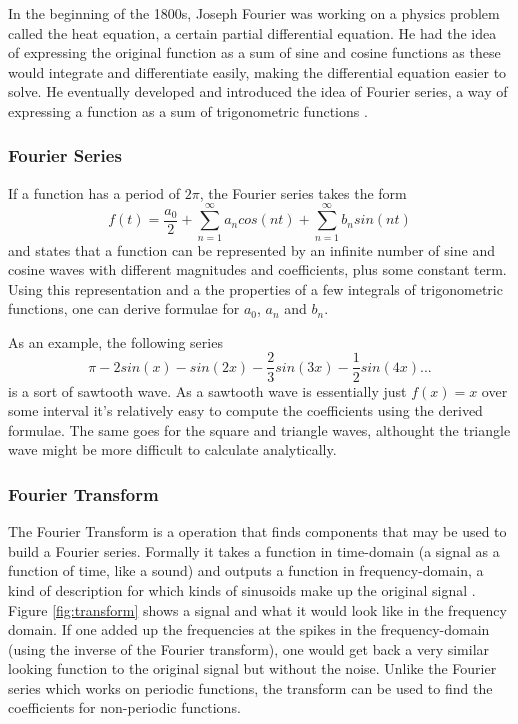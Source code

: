 In the beginning of the 1800s, Joseph Fourier was working on a physics problem called the heat equation, a certain partial differential equation. He had the idea of expressing the original function as a sum of sine and cosine functions as these would integrate and differentiate easily, making the differential equation easier to solve. He eventually developed and introduced the idea of Fourier series, a way of expressing a function as a sum of trigonometric functions \cite{Bounchaleun2019}.
\subsubsection{Fourier Series} 
If a function has a period of $2\pi$, the Fourier series takes the form $$f(t) = \frac{a_0}{2} + \sum_{n=1}^{\infty}a_ncos(nt)+\sum_{n=1}^{\infty}b_nsin(nt)$$ and states that a function can be represented by an infinite number of sine and cosine waves with different magnitudes and coefficients, plus some constant term. Using this representation and a the properties of a few integrals of trigonometric functions, one can derive formulae for $a_0$, $a_n$ and $b_n$.

As an example, the following series $$\pi -2sin(x) -sin(2x) -\frac{2}{3}sin(3x) -\frac{1}{2}sin(4x) ... $$ is a sort of sawtooth wave. As a sawtooth wave is essentially just $f(x) = x$ over some interval it's relatively easy to compute the coefficients using the derived formulae. The same goes for the square and triangle waves, althought the triangle wave might be more difficult to calculate analytically.
 
\subsubsection{Fourier Transform} 
The Fourier Transform is a operation that finds components that may be used to build a Fourier series. Formally it takes a function in time-domain (a signal as a function of time, like a sound) and outputs a function in frequency-domain, a kind of description for which kinds of sinusoids make up the original signal \cite{SimonXu2015}. Figure \ref{fig:transform} shows a signal and what it would look like in the frequency domain. If one added up the frequencies at the spikes in the frequency-domain (using the inverse of the Fourier transform), one would get back a very similar looking function to the original signal but without the noise. Unlike the Fourier series which works on periodic functions, the transform can be used to find the coefficients for non-periodic functions.

